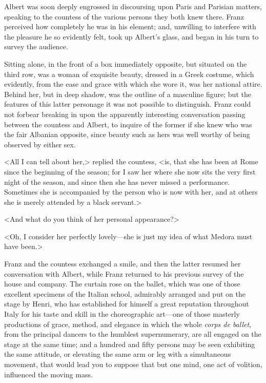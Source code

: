 Albert was soon deeply engrossed in discoursing upon Paris and Parisian matters, speaking to the countess of the various persons they both knew there. Franz perceived how completely he was in his element; and, unwilling to interfere with the pleasure he so evidently felt, took up Albert's glass, and began in his turn to survey the audience. 

 Sitting alone, in the front of a box immediately opposite, but situated on the third row, was a woman of exquisite beauty, dressed in a Greek costume, which evidently, from the ease and grace with which she wore it, was her national attire. Behind her, but in deep shadow, was the outline of a masculine figure; but the features of this latter personage it was not possible to distinguish. Franz could not forbear breaking in upon the apparently interesting conversation passing between the countess and Albert, to inquire of the former if she knew who was the fair Albanian opposite, since beauty such as hers was well worthy of being observed by either sex. 

 <All I can tell about her,> replied the countess, <is, that she has been at Rome since the beginning of the season; for I saw her where she now sits the very first night of the season, and since then she has never missed a performance. Sometimes she is accompanied by the person who is now with her, and at others she is merely attended by a black servant.> 

 <And what do you think of her personal appearance?> 

 <Oh, I consider her perfectly lovely—she is just my idea of what Medora must have been.> 

 Franz and the countess exchanged a smile, and then the latter resumed her conversation with Albert, while Franz returned to his previous survey of the house and company. The curtain rose on the ballet, which was one of those excellent specimens of the Italian school, admirably arranged and put on the stage by Henri, who has established for himself a great reputation throughout Italy for his taste and skill in the choreographic art—one of those masterly productions of grace, method, and elegance in which the whole \textit{corps de ballet}, from the principal dancers to the humblest supernumerary, are all engaged on the stage at the same time; and a hundred and fifty persons may be seen exhibiting the same attitude, or elevating the same arm or leg with a simultaneous movement, that would lead you to suppose that but one mind, one act of volition, influenced the moving mass. 

